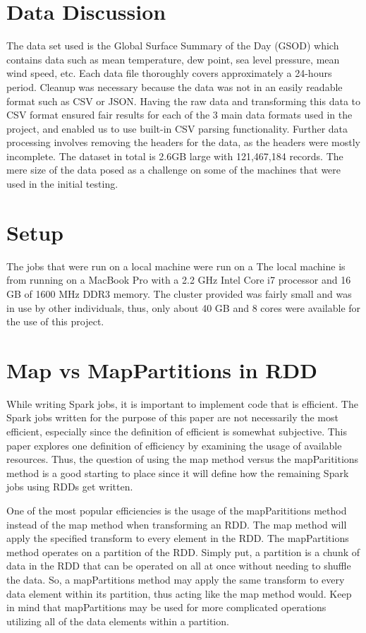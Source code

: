 \documentclass[conference]{IEEEtran}
\begin{document}
\section{Data Discussion}
The data set used is the Global Surface Summary of the Day (GSOD) which contains data such as mean temperature, dew point, sea level pressure, mean wind speed, etc.
Each data file thoroughly covers approximately a 24-hours period.\cite{b7}
Cleanup was necessary because the data was not in an easily readable format such as CSV or JSON. Having the raw data and transforming this data to CSV format ensured fair results for each of the 3 main data formats used in the project, and enabled us to use built-in CSV parsing functionality.
Further data processing involves removing the headers for the data, as the headers were mostly incomplete.
The dataset in total is 2.6GB large with 121,467,184 records.
The mere size of the data posed as a challenge on some of the machines that were used in the initial testing.


\section{Setup}
The jobs that were run on a local machine were run on a The local machine is from running on a MacBook Pro with a 2.2 GHz Intel Core i7 processor and 16 GB of 1600 MHz DDR3 memory.
The cluster provided was fairly small and was in use by other individuals, thus, only about 40 GB and 8 cores were available for the use of this project.

\section{Map vs MapPartitions in RDD}
While writing Spark jobs, it is important to implement code that is efficient.
The Spark jobs written for the purpose of this paper are not necessarily the most efficient, especially since the definition of efficient is somewhat subjective.
This paper explores one definition of efficiency by examining the usage of available resources.
Thus, the question of using the map method versus the mapParititions method is a good starting to place since it will define how the remaining Spark jobs using RDDs get written.

One of the most popular efficiencies is the usage of the mapParititions method instead of the map method when transforming an RDD.
The map method will apply the specified transform to every element in the RDD.
The mapPartitions method operates on a partition of the RDD.
Simply put, a partition is a chunk of data in the RDD that can be operated on all at once without needing to shuffle the data.
So, a mapPartitions method may apply the same transform to every data element within its partition, thus acting like the map method would.
Keep in mind that mapPartitions may be used for more complicated operations utilizing all of the data elements within a partition.
\end{document}
